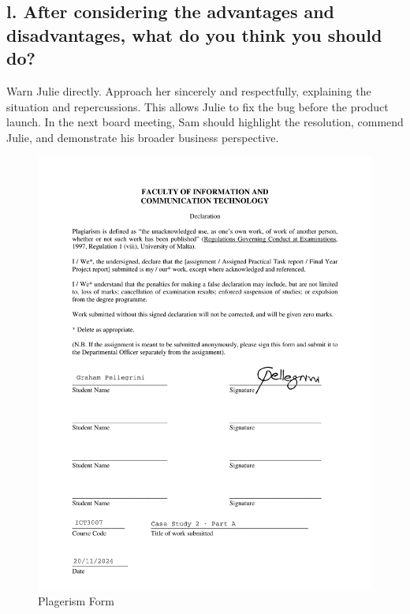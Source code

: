\documentclass{article}
\begin{document}
\subsection{l. After considering the advantages and disadvantages, what do you think you should do?}
Warn Julie directly. Approach her sincerely and respectfully, explaining the situation and repercussions. This allows Julie to fix the bug before the product launch. In the next board meeting, Sam should highlight the resolution, commend Julie, and demonstrate his broader business perspective.

\pagebreak

\begin{figure}[h]
    \centering
    \includegraphics[width=1.2\textwidth]{PlagiarismForm_PartA_SAM.pdf}
    \caption{Plagerism Form}
\end{figure}
\end{document}
